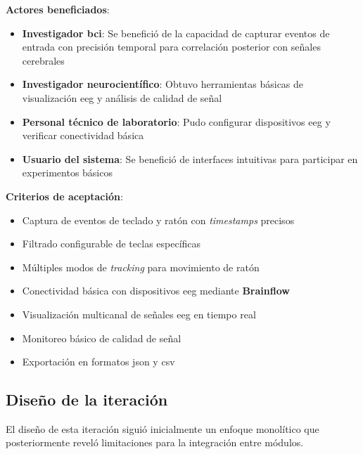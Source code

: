 \textbf{Actores beneficiados}:
\begin{itemize}
    \item \textbf{Investigador \acrshort{bci}}: Se benefició de la capacidad de capturar eventos de entrada con precisión temporal para correlación posterior con señales cerebrales
    \item \textbf{Investigador neurocientífico}: Obtuvo herramientas básicas de visualización \acrshort{eeg} y análisis de calidad de señal
    \item \textbf{Personal técnico de laboratorio}: Pudo configurar dispositivos \acrshort{eeg} y verificar conectividad básica
    \item \textbf{Usuario del sistema}: Se benefició de interfaces intuitivas para participar en experimentos básicos
\end{itemize}

\textbf{Criterios de aceptación}:
\begin{itemize}
    \item Captura de eventos de teclado y ratón con \textit{\glspl{timestamp}} precisos
    \vspace*{-0.005\textheight}
    \item Filtrado configurable de teclas específicas
    \vspace*{-0.005\textheight}
    \item Múltiples modos de \textit{tracking} para movimiento de ratón
    \vspace*{-0.005\textheight}
    \item Conectividad básica con dispositivos \acrshort{eeg} mediante \textbf{Brainflow}
    \vspace*{-0.005\textheight}
    \item Visualización multicanal de señales \acrshort{eeg} en tiempo real
    \vspace*{-0.005\textheight}
    \item Monitoreo básico de calidad de señal
    \vspace*{-0.005\textheight}
    \item Exportación en formatos \acrshort{json} y \acrshort{csv}
\end{itemize}

\subsection{Diseño de la iteración}
\label{subsec:diseno_iteracion_1}

El diseño de esta iteración siguió inicialmente un enfoque monolítico que posteriormente reveló limitaciones para la integración entre módulos.

